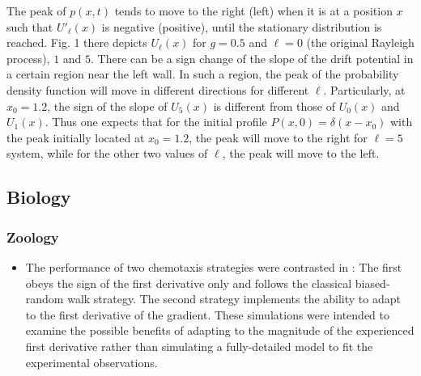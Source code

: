 \documentclass[11pt]{book}
\begin{document}
\begin{itemize}
The peak of $p\left(x,t\right)$ tends to move to the right (left)
when it is at a position $x$ such that $U'_{\ell}\left(x\right)$
is negative (positive), until the stationary distribution is reached.
Fig. 1 there depicts $U_{\ell}\left(x\right)$ for $g=0.5$ and $\ell=0$
(the original Rayleigh process), $1$ and $5$. There can be a sign
change of the slope of the drift potential in a certain region near
the left wall. In such a region, the peak of the probability density
function will move in different directions for different $\ell$.
Particularly, at $x_{0}=1.2$, the sign of the slope of $U_{5}\left(x\right)$
is different from those of $U_{0}\left(x\right)$ and $U_{1}\left(x\right)$.
Thus one expects that for the initial profile $P\left(x,0\right)=\delta\left(x-x_{0}\right)$
with the peak initially located at $x_{0}=1.2$, the peak will move
to the right for $\ell=5$ system, while for the other two values
of $\ell$, the peak will move to the left.
\end{itemize}

\subsection{Biology}
\subsubsection{Zoology}
\begin{itemize}
\item The performance of two chemotaxis strategies were contrasted in \cite{itskovits2018concerted}:
The first obeys the sign of the first derivative only and follows
the classical biased-random walk strategy. The second strategy implements
the ability to adapt to the first derivative of the gradient. These
simulations were intended to examine the possible benefits of adapting
to the magnitude of the experienced first derivative rather than simulating
a fully-detailed model to fit the experimental observations.
\end{itemize}
\end{document}
